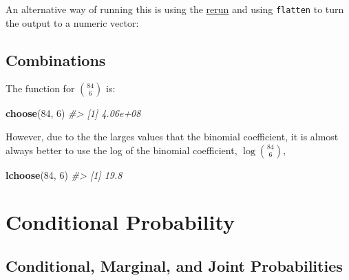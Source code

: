 \documentclass[]{book}
\newenvironment{Shaded}{\begin{snugshade}}{\end{snugshade}}
\newcommand{\KeywordTok}[1]{\textcolor[rgb]{0.13,0.29,0.53}{\textbf{#1}}}
\newcommand{\DecValTok}[1]{\textcolor[rgb]{0.00,0.00,0.81}{#1}}
\newcommand{\StringTok}[1]{\textcolor[rgb]{0.31,0.60,0.02}{#1}}
\newcommand{\CommentTok}[1]{\textcolor[rgb]{0.56,0.35,0.01}{\textit{#1}}}
\newcommand{\OperatorTok}[1]{\textcolor[rgb]{0.81,0.36,0.00}{\textbf{#1}}}
\newcommand{\NormalTok}[1]{#1}
\theoremstyle{definition}
\theoremstyle{definition}
\theoremstyle{definition}
\theoremstyle{remark}
\begin{document}
An alternative way of running this is using the
\href{https://www.rdocumentation.org/packages/purrr/topics/rerun}{rerun}
and using \texttt{flatten} to turn the output to a numeric vector:

\begin{Shaded}
\end{Shaded}

\subsection{Combinations}\label{combinations}

The function for \(84\choose{6}\) is:

\begin{Shaded}
\begin{Highlighting}[]
\KeywordTok{choose}\NormalTok{(}\DecValTok{84}\NormalTok{, }\DecValTok{6}\NormalTok{)}
\CommentTok{#> [1] 4.06e+08}
\end{Highlighting}
\end{Shaded}

However, due to the the larges values that the binomial coefficient, it
is almost always better to use the log of the binomial coefficient,
\(\log{84\choose{6}}\),

\begin{Shaded}
\begin{Highlighting}[]
\KeywordTok{lchoose}\NormalTok{(}\DecValTok{84}\NormalTok{, }\DecValTok{6}\NormalTok{)}
\CommentTok{#> [1] 19.8}
\end{Highlighting}
\end{Shaded}

\section{Conditional Probability}\label{conditional-probability}

\subsection{Conditional, Marginal, and Joint
Probabilities}\label{conditional-marginal-and-joint-probabilities}
\end{document}
